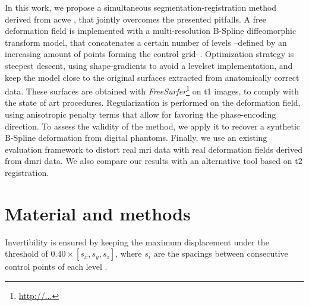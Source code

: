 \documentclass{llncs}
\begin{document}
In this work, we propose a simultaneous segmentation-registration
  method derived from \gls*{acwe} \cite{chan_active_2001}, that
  jointly overcomes the presented pitfalls.
A free deformation field is implemented with a multi-resolution 
  B-Spline diffeomorphic transform model, that concatenates a 
  certain number of levels --defined by an increasing amount of points
  forming the control grid--.
Optimization strategy is steepest descent, using shape-gradients
  \cite{jehan-besson_dream2s:_2003} to avoid a levelset implementation,
  and keep the model close to the original surfaces extracted from
  anatomically correct data.
These surfaces are obtained with \emph{FreeSurfer}\footnote{\url{http://...}}
  on \gls*{t1} images, to comply with the state of art procedures.
Regularization is performed on the deformation field, using anisotropic
  penalty terms that allow for favoring the phase-encoding direction.
To assess the validity of the method, we apply it to recover
  a synthetic B-Spline deformation from digital phantoms.
Finally, we use an existing evaluation framework \cite{esteban_simulation-based_2014}
  to distort real \gls*{mri} data with real deformation fields derived
  from \gls*{dmri} data.
We also compare our results with an alternative tool based on \gls*{t2}
  registration.
  
\section{Material and methods}\label{sec:methods}

Invertibility is ensured by keeping the maximum displacement under
  the threshold of $0.40 \times [ s_x, s_y, s_z ]$, where $s_i$ are
  the spacings between consecutive control points of each level
  \cite{rueckert_diffeomorphic_2006}.




\end{document}
